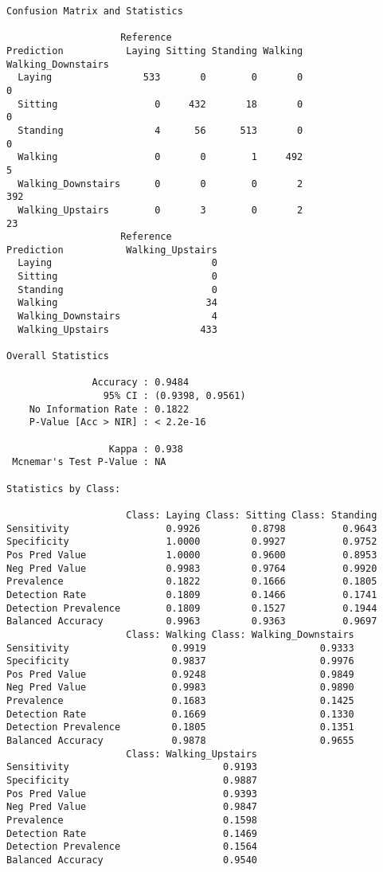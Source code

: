 \documentclass[11pt]{article}
\begin{document}
    
    \begin{verbatim}
Confusion Matrix and Statistics

                    Reference
Prediction           Laying Sitting Standing Walking Walking_Downstairs
  Laying                533       0        0       0                  0
  Sitting                 0     432       18       0                  0
  Standing                4      56      513       0                  0
  Walking                 0       0        1     492                  5
  Walking_Downstairs      0       0        0       2                392
  Walking_Upstairs        0       3        0       2                 23
                    Reference
Prediction           Walking_Upstairs
  Laying                            0
  Sitting                           0
  Standing                          0
  Walking                          34
  Walking_Downstairs                4
  Walking_Upstairs                433

Overall Statistics
                                          
               Accuracy : 0.9484          
                 95% CI : (0.9398, 0.9561)
    No Information Rate : 0.1822          
    P-Value [Acc > NIR] : < 2.2e-16       
                                          
                  Kappa : 0.938           
 Mcnemar's Test P-Value : NA              

Statistics by Class:

                     Class: Laying Class: Sitting Class: Standing
Sensitivity                 0.9926         0.8798          0.9643
Specificity                 1.0000         0.9927          0.9752
Pos Pred Value              1.0000         0.9600          0.8953
Neg Pred Value              0.9983         0.9764          0.9920
Prevalence                  0.1822         0.1666          0.1805
Detection Rate              0.1809         0.1466          0.1741
Detection Prevalence        0.1809         0.1527          0.1944
Balanced Accuracy           0.9963         0.9363          0.9697
                     Class: Walking Class: Walking_Downstairs
Sensitivity                  0.9919                    0.9333
Specificity                  0.9837                    0.9976
Pos Pred Value               0.9248                    0.9849
Neg Pred Value               0.9983                    0.9890
Prevalence                   0.1683                    0.1425
Detection Rate               0.1669                    0.1330
Detection Prevalence         0.1805                    0.1351
Balanced Accuracy            0.9878                    0.9655
                     Class: Walking_Upstairs
Sensitivity                           0.9193
Specificity                           0.9887
Pos Pred Value                        0.9393
Neg Pred Value                        0.9847
Prevalence                            0.1598
Detection Rate                        0.1469
Detection Prevalence                  0.1564
Balanced Accuracy                     0.9540
    \end{verbatim}

    

    
    
    
    
\end{document}
